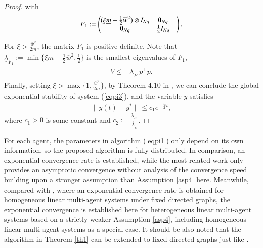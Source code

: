 \documentclass[final,5p,times,twocolumn,authoryear]{elsarticle}
\begin{document}
\begin{proof}
	with
	\begin{align}
		F_1:=
		\begin{pmatrix}
			(\xi\underline m-\frac{1}{2}\overline w^2)\otimes I_{Nq}& \boldsymbol0_{Nq}& \\
			\boldsymbol0_{Nq}& \frac{1}{2} I_{Nq}& \\
		\end{pmatrix}.\notag
	\end{align}
	
	For $\xi > \frac{\overline w^2}{2\underline m}$, the matrix $F_1$ is positive definite. Note that $\underline \lambda_{F_1}:=\min\{\xi\underline m-\frac{1}{2}\overline w^2, \frac{1}{2}\}$ is the smallest eigenvalues of $F_1$,
	\begin{align}
		\dot V \le -\underline \lambda_{F_1}p^\top p.\label{v1'1}
	\end{align}
	Finally, setting $\xi>\max\{1,\frac{\overline w^2}{2\underline m}\}$, by Theorem 4.10 in \citet{nonlinear}, we can conclude the global exponential stability of system (\ref{eqpi3}), and the variable $y$ satisfies
	\begin{align}
		\|y(t)-y^*\| \le c_1e^{-\frac{c_2}{2}t},\label{yt}
	\end{align}
	where $c_1>0$ is some constant and $c_2:=\frac{\underline \lambda_{F_1}}{\overline\lambda_{_E}}$.	
\end{proof}

\begin{remark}
	For each agent, the parameters in algorithm (\ref{eqpi1}) only depend on its own information, so the proposed algorithm is fully distributed. In comparison, an exponential convergence rate is established, while the most related work \citep{li2020} only provides an asymptotic convergence without analysis of the convergence speed building upon a stronger assumption than Assumption \ref{asp4} here. Meanwhile, compared with \citet{zhang2020}, where an exponential convergence rate is obtained for homogeneous linear multi-agent systems under fixed directed graphs, the exponential convergence is established here for heterogeneous linear multi-agent systems based on a strictly weaker Assumption \ref{asp4}, including homogeneous linear multi-agent systems as a special case. It should be also noted that the algorithm in Theorem \ref{th1} can be extended to fixed directed graphs just like \citet{zhang2020}.
\end{remark}
\end{document}
